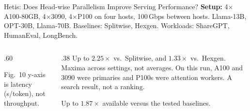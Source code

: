 \begin{frame}[t,label=main_hetis_results]{Hetis: Does Head-wise Parallelism Improve Serving Performance?}
{\footnotesize\textbf{Setup:} 4$\times$A100-80GB, 4$\times$3090, 4$\times$P100 on four hosts, 100\,Gbps between hosts. Llama-13B, OPT-30B, Llama-70B. Baselines: Splitwise, Hexgen. Workloads: ShareGPT, HumanEval, LongBench.}
\begin{columns}[T,onlytextwidth]
\begin{column}{.60\textwidth}
\par
{\footnotesize Fig.~10 y-axis is latency (s/token), not throughput.\par}
\vspace{.02cm}
\end{column}
\begin{column}{.38\textwidth}
{\footnotesize Up to $2.25\times$  vs.\ Splitwise, and $1.33\times$ vs.\ Hexgen. Maxima across settings, not averages.}
\vspace{.02cm}
{\footnotesize On this  run, A100 and 3090 were primaries and P100s were attention workers. A search result, not a ranking.}
\vspace{.02cm}
\par
{}
{\footnotesize Up to $1.87\times$ available  versus the tested baselines.}
\end{column}
\end{columns}
\end{frame}

